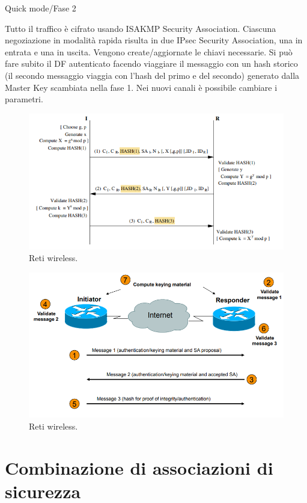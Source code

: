 Quick mode/Fase 2

Tutto il traffico è cifrato usando ISAKMP Security Association. Ciascuna negoziazione in modalità rapida risulta in due IPsec Security Association, una in entrata e una in uscita. Vengono create/aggiornate le chiavi necessarie. 
Si può fare subito il DF autenticato facendo viaggiare il messaggio con un hash storico (il secondo messaggio viaggia con l'hash del primo e del secondo) generato dalla Master Key scambiata nella fase 1. Nei nuovi canali è possibile cambiare i parametri.

\begin{figure}[h]
    \centering
    \includegraphics[width=1\textwidth]{images/chapter9/9-15.png}
    \caption{Reti wireless.}
    \label{fig:9-15}
\end{figure}

\begin{figure}[h]
    \centering
    \includegraphics[width=1\textwidth]{images/chapter9/9-16.png}
    \caption{Reti wireless.}
    \label{fig:9-16}
\end{figure}

\section{Combinazione di associazioni di sicurezza }

